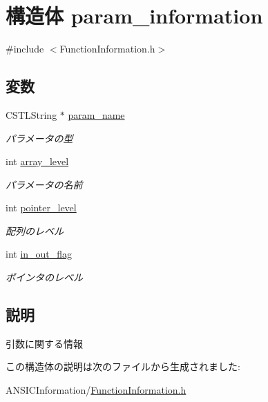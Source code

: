 \section{構造体 param\_\-information}
\label{structparam__information}


{\ttfamily \#include $<$FunctionInformation.h$>$}

\subsection*{変数}
\begin{DoxyCompactItemize}
\item 
CSTLString $\ast$ \hyperlink{structparam__information_a205ee85821326a29e5729bd911bf0561}{param\_\-name}\label{structparam__information_a205ee85821326a29e5729bd911bf0561}

\begin{DoxyCompactList}\small\item\em パラメータの型 \item\end{DoxyCompactList}\item 
int \hyperlink{structparam__information_ac5e2a275c4e9848e2ad3a81937deda80}{array\_\-level}\label{structparam__information_ac5e2a275c4e9848e2ad3a81937deda80}

\begin{DoxyCompactList}\small\item\em パラメータの名前 \item\end{DoxyCompactList}\item 
int \hyperlink{structparam__information_a19b6cd4d981eb0050622f0195bd173b0}{pointer\_\-level}\label{structparam__information_a19b6cd4d981eb0050622f0195bd173b0}

\begin{DoxyCompactList}\small\item\em 配列のレベル \item\end{DoxyCompactList}\item 
int \hyperlink{structparam__information_aed609e4d8cf941c7e83309dea078edab}{in\_\-out\_\-flag}\label{structparam__information_aed609e4d8cf941c7e83309dea078edab}

\begin{DoxyCompactList}\small\item\em ポインタのレベル \item\end{DoxyCompactList}\end{DoxyCompactItemize}


\subsection{説明}
引数に関する情報 

この構造体の説明は次のファイルから生成されました:\begin{DoxyCompactItemize}
\item 
ANSICInformation/\hyperlink{FunctionInformation_8h}{FunctionInformation.h}\end{DoxyCompactItemize}
